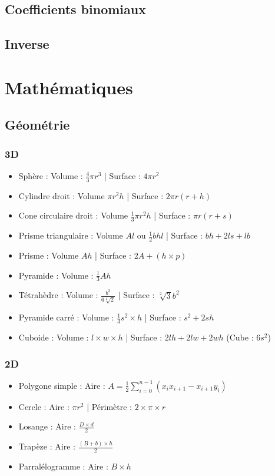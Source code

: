 \documentclass[8pt]{article}
\begin{document}
        \subsection{Coefficients binomiaux}
        {\scriptsize}
        \subsection{Inverse}
        {\scriptsize}
    \section{Mathématiques}
        \subsection{Géométrie}
            \subsubsection{3D}
            \begin{itemize}
                \item Sphère : Volume : $\frac{4}{3}\pi r^{3}$ | Surface : $4\pi r^{2}$
                \item Cylindre droit : Volume $\pi r^{2} h$ | Surface : $2\pi r( r + h)$
                \item Cone circulaire droit : Volume $\frac{1}{3} \pi r^{2} h$ | Surface : $\pi r( r + s)$
                \item Prisme triangulaire : Volume $A  l$ ou $\frac{1}{2}bhl$ | Surface : $bh + 2ls + lb$
                \item Prisme : Volume $Ah$ | Surface : $2A + (h \times p)$
                \item Pyramide : Volume : $\frac{1}{3}Ah$
                \item Tétrahèdre : Volume : $\frac{b^{3}}{6  \sqrt[2]{2}}$ | Surface : $\sqrt[2]{3}b^{2}$
                \item Pyramide carré : Volume : $\frac{1}{3}s^{2}\times h$ | Surface : $s^{2} + 2sh$
                \item Cuboide : Volume : $l\times w \times h$ | Surface : $2lh + 2lw +2wh$ (Cube : $6s^{2}$)
            \end{itemize}
            \subsubsection{2D}
            \begin{itemize}
                \item Polygone simple : Aire : $A = \frac{1}{2} \sum_{i=0}^{n-1}\left(x_{i}x_{i+1} - x_{i+1}y_{i}\right)$
                \item Cercle : Aire : $\pi r^{2}$ | Périmètre : $2\times \pi \times r$
                \item Losange : Aire : $\frac{D\times d}{2}$
                \item Trapèze : Aire : $\frac{(B+b)\times h}{2}$
                \item Parralélogramme : Aire : $B\times h$
            \end{itemize}
\end{document}
